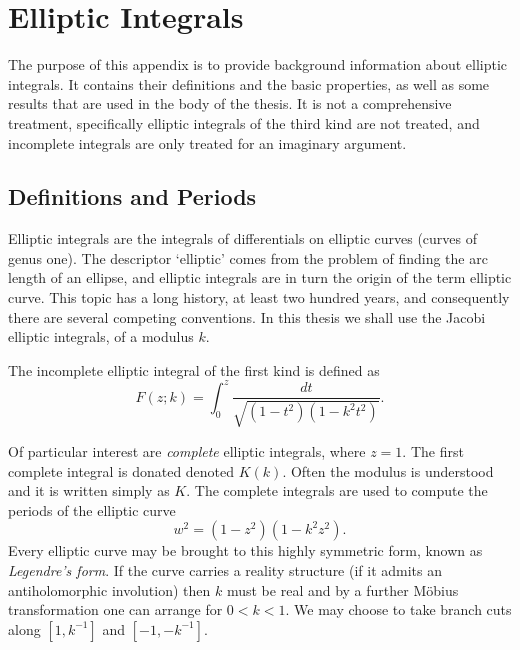 
\section{Elliptic Integrals}
\label{sec:Elliptic Integrals}

\stoptocentries

The purpose of this appendix is to provide background information about elliptic integrals. It contains their definitions and the basic properties, as well as some results that are used in the body of the thesis. It is not a comprehensive treatment, specifically elliptic integrals of the third kind are not treated, and incomplete integrals are only treated for an imaginary argument.

\subsection{Definitions and Periods}
Elliptic integrals are the integrals of differentials on elliptic curves (curves of genus one). The descriptor `elliptic' comes from the problem of finding the arc length of an ellipse, and elliptic integrals are in turn the origin of the term elliptic curve. This topic has a long history, at least two hundred years, and consequently there are several competing conventions. In this thesis we shall use the Jacobi elliptic integrals, of a modulus $k$.

\begin{defn}
The incomplete elliptic integral of the first kind is defined as
\[
F(z;k) = \int_0^z \frac{dt}{\sqrt{(1-t^2)(1-k^2 t^2)}}.
\]
\end{defn}

Of particular interest are \emph{complete} elliptic integrals, where $z=1$. The first complete integral is donated denoted $K(k)$. Often the modulus is understood and it is written simply as $K$. The complete integrals are used to compute the periods of the elliptic curve
\[
w^2 = (1-z^2)(1-k^2 z^2).
\]
Every elliptic curve may be brought to this highly symmetric form, known as {\it Legendre's form}. If the curve carries a reality structure (if it admits an antiholomorphic involution) then $k$ must be real and by a further M\"obius transformation one can arrange for $0 < k < 1$. We may choose to take branch cuts along $[1,k^{-1}]$ and $[-1,-k^{-1}]$.

